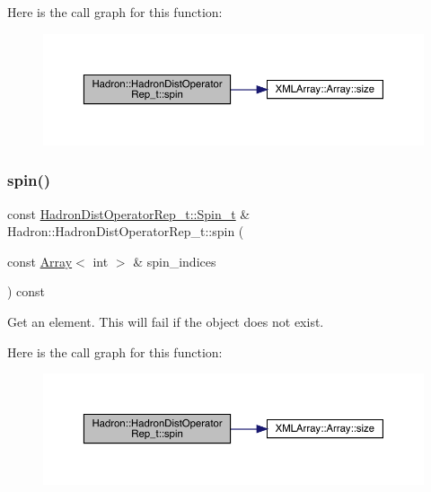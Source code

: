 Here is the call graph for this function\+:\nopagebreak
\begin{figure}[H]
\begin{center}
\leavevmode
\includegraphics[width=350pt]{dd/de0/classHadron_1_1HadronDistOperatorRep__t_ad889e6377702e72419f259860142225f_cgraph}
\end{center}
\end{figure}
\mbox{\label{classHadron_1_1HadronDistOperatorRep__t_afdc4b290b39dd14deb08a54cec303f5f}} 
\subsubsection{\texorpdfstring{spin()}{spin()}\hspace{0.1cm}{\footnotesize\ttfamily [8/8]}}
{\footnotesize\ttfamily const \mbox{\hyperlink{structHadron_1_1HadronDistOperatorRep__t_1_1Spin__t}{Hadron\+Dist\+Operator\+Rep\+\_\+t\+::\+Spin\+\_\+t}} \& Hadron\+::\+Hadron\+Dist\+Operator\+Rep\+\_\+t\+::spin (\begin{DoxyParamCaption}\item[{const \mbox{\hyperlink{classXMLArray_1_1Array}{Array}}$<$ int $>$ \&}]{spin\+\_\+indices }\end{DoxyParamCaption}) const}



Get an element. This will fail if the object does not exist. 

Here is the call graph for this function\+:\nopagebreak
\begin{figure}[H]
\begin{center}
\leavevmode
\includegraphics[width=350pt]{dd/de0/classHadron_1_1HadronDistOperatorRep__t_afdc4b290b39dd14deb08a54cec303f5f_cgraph}
\end{center}
\end{figure}
\mbox{\label{classHadron_1_1HadronDistOperatorRep__t_a13c4b6d851e65136c55ccee152e72a12}} 
